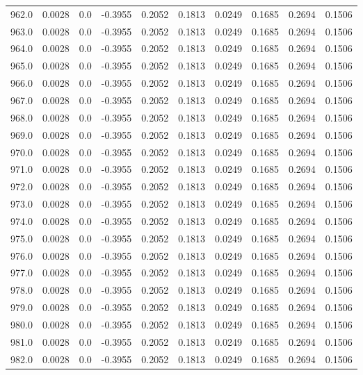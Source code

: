 \begin{longtable}{lrrrrrrrrr}
962.0 & 0.0028 & 0.0 & -0.3955 & 0.2052 & 0.1813 & 0.0249 & 0.1685 & 0.2694 & 0.1506 \\
963.0 & 0.0028 & 0.0 & -0.3955 & 0.2052 & 0.1813 & 0.0249 & 0.1685 & 0.2694 & 0.1506 \\
964.0 & 0.0028 & 0.0 & -0.3955 & 0.2052 & 0.1813 & 0.0249 & 0.1685 & 0.2694 & 0.1506 \\
965.0 & 0.0028 & 0.0 & -0.3955 & 0.2052 & 0.1813 & 0.0249 & 0.1685 & 0.2694 & 0.1506 \\
966.0 & 0.0028 & 0.0 & -0.3955 & 0.2052 & 0.1813 & 0.0249 & 0.1685 & 0.2694 & 0.1506 \\
967.0 & 0.0028 & 0.0 & -0.3955 & 0.2052 & 0.1813 & 0.0249 & 0.1685 & 0.2694 & 0.1506 \\
968.0 & 0.0028 & 0.0 & -0.3955 & 0.2052 & 0.1813 & 0.0249 & 0.1685 & 0.2694 & 0.1506 \\
969.0 & 0.0028 & 0.0 & -0.3955 & 0.2052 & 0.1813 & 0.0249 & 0.1685 & 0.2694 & 0.1506 \\
970.0 & 0.0028 & 0.0 & -0.3955 & 0.2052 & 0.1813 & 0.0249 & 0.1685 & 0.2694 & 0.1506 \\
971.0 & 0.0028 & 0.0 & -0.3955 & 0.2052 & 0.1813 & 0.0249 & 0.1685 & 0.2694 & 0.1506 \\
972.0 & 0.0028 & 0.0 & -0.3955 & 0.2052 & 0.1813 & 0.0249 & 0.1685 & 0.2694 & 0.1506 \\
973.0 & 0.0028 & 0.0 & -0.3955 & 0.2052 & 0.1813 & 0.0249 & 0.1685 & 0.2694 & 0.1506 \\
974.0 & 0.0028 & 0.0 & -0.3955 & 0.2052 & 0.1813 & 0.0249 & 0.1685 & 0.2694 & 0.1506 \\
975.0 & 0.0028 & 0.0 & -0.3955 & 0.2052 & 0.1813 & 0.0249 & 0.1685 & 0.2694 & 0.1506 \\
976.0 & 0.0028 & 0.0 & -0.3955 & 0.2052 & 0.1813 & 0.0249 & 0.1685 & 0.2694 & 0.1506 \\
977.0 & 0.0028 & 0.0 & -0.3955 & 0.2052 & 0.1813 & 0.0249 & 0.1685 & 0.2694 & 0.1506 \\
978.0 & 0.0028 & 0.0 & -0.3955 & 0.2052 & 0.1813 & 0.0249 & 0.1685 & 0.2694 & 0.1506 \\
979.0 & 0.0028 & 0.0 & -0.3955 & 0.2052 & 0.1813 & 0.0249 & 0.1685 & 0.2694 & 0.1506 \\
980.0 & 0.0028 & 0.0 & -0.3955 & 0.2052 & 0.1813 & 0.0249 & 0.1685 & 0.2694 & 0.1506 \\
981.0 & 0.0028 & 0.0 & -0.3955 & 0.2052 & 0.1813 & 0.0249 & 0.1685 & 0.2694 & 0.1506 \\
982.0 & 0.0028 & 0.0 & -0.3955 & 0.2052 & 0.1813 & 0.0249 & 0.1685 & 0.2694 & 0.1506 \\

\end{longtable}
